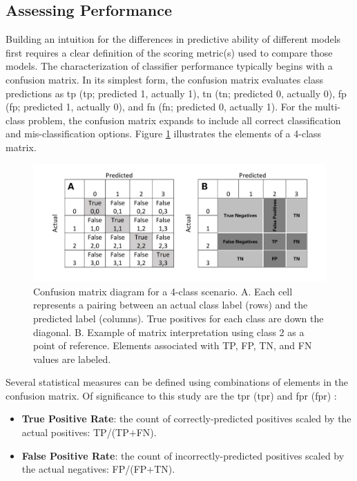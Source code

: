 \subsection{Assessing Performance}
Building an intuition for the differences in predictive ability of different models first requires a clear definition of the scoring metric(s) used to compare those models. The characterization of classifier performance typically begins with a confusion matrix. In its simplest form, the confusion matrix evaluates class predictions as \acrlong{tp} (\acrshort{tp}; predicted 1, actually 1), \acrlong{tn} (\acrshort{tn}; predicted 0, actually 0), \acrlong{fp} (\acrshort{fp}; predicted 1, actually 0), and \acrlong{fn} (\acrshort{fn}; predicted 0, actually 1). For the multi-class problem, the confusion matrix expands to include all correct classification and mis-classification options. Figure \ref{fig:confusion_matrix} illustrates the elements of a 4-class matrix.

\begin{figure}[!htp]
\centering
\includegraphics[width=\textwidth]{templates/images/Figure-Confusion_Matrix.png}
\caption[Four-class confusion matrix]{Confusion matrix diagram for a 4-class scenario. A. Each cell represents a pairing between an actual class label (rows) and the predicted label (columns). True positives for each class are down the diagonal. B. Example of matrix interpretation using class 2 as a point of reference. Elements associated with TP, FP, TN, and FN values are labeled.}
\label{fig:confusion_matrix}
\end{figure}

Several statistical measures can be defined using combinations of elements in the confusion matrix. Of significance to this study are the \acrlong{tpr} (\acrshort{tpr}) and \acrlong{fpr} (\acrshort{fpr}) \citep{tharwat_classification_2020}:

\begin{itemize}
\item \textbf{True Positive Rate}: the count of correctly-predicted positives scaled by the actual positives: TP/(TP$+$FN).
\item \textbf{False Positive Rate}: the count of incorrectly-predicted positives scaled by the actual negatives: FP/(FP$+$TN).
\end{itemize}

